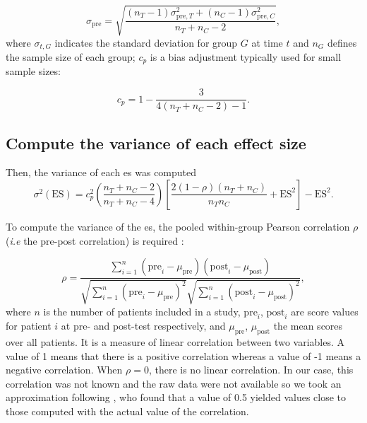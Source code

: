 \documentclass[12pt,a4paper,english]{article}
\begin{document}
\begin{equation}
\label{eq:stats_metareview_std_pre}
\sigma_{\text{pre}} = \sqrt{\frac{(n_T - 1)\sigma_{\text{pre},T}^2 + (n_C - 1)\sigma_{\text{pre},C}^2} {n_T + n_C - 2}},
\end{equation}
\noindent where $\sigma_{t,G}$ indicates the standard deviation for group $G$ at time $t$ and $n_G$ defines the sample size of each group; 
$c_p$ is a bias adjustment typically used for small sample sizes:

\begin{equation}
\label{eq:metareview_correction_factor}
c_p =  1 - \frac{3} {4(n_T + n_C - 2) - 1}. 
\end{equation} 

\subsection{Compute the variance of each effect size}

Then, the variance of each \gls{es} was computed \citep{Morris2008}
\begin{equation}
\label{eq:metareview_variance_ES}
\sigma^2(\text{ES}) = c_p^2 \left (\frac{n_T + n_C - 2} {n_T + n_C - 4} \right ) \left  [ \frac{2(1-\rho)(n_T + n_C)} {n_Tn_C} + \text{ES}^2 \right ] - \text{ES}^2.
\end{equation} 

To compute the variance of the \gls{es}, the pooled within-group Pearson correlation $\rho$ (\textit{i.e} the pre-post correlation) is required 
\citep{James2013}:

\begin{equation}
\label{eq:metareview_within_group_pearson_correlation}
\rho =  \frac{ \sum_{i=1}^{n} (\text{pre}_i - \mu_{\text{pre}})(\text{post}_i - \mu_{\text{post}}) } { \sqrt{ \sum_{i=1}^{n} (\text{pre}_i - \mu_{\text{pre}})^2} \sqrt{\sum_{i=1}^{n} (\text{post}_i - \mu_{\text{post}})^2} }, 
\end{equation}
\noindent where $n$ is the number of patients included in a study, $\text{pre}_i$, $\text{post}_i$ are score values for patient $i$ at pre- and post-test 
respectively, and $\mu_{\text{pre}}$, $\mu_{\text{post}}$ the mean scores over all patients. It is a measure of linear correlation between two variables. 
A value of 1 means that there is a positive correlation whereas a value of -1 means a negative correlation. When $\rho=0$, there is no
linear correlation. In our case, this correlation was not known and the raw data were not available so we took an
approximation following \citet{Balk2012}, who found that a value of 0.5 yielded values close to those computed with the actual value of the correlation. 
\end{document}
